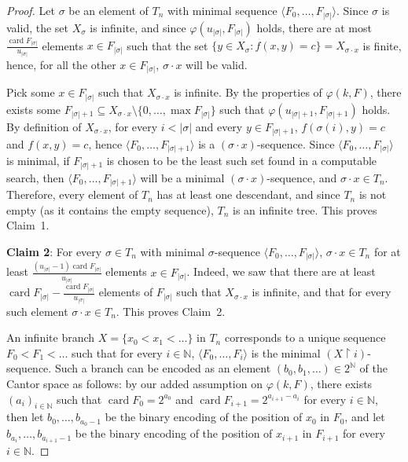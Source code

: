 \documentclass{article}
\numberwithin{theorem}{section}
\newcommand{\uh}{\upharpoonright}
\newcommand{\NN}[0]{\mathbb{N}}
\newcommand{\card}{\operatorname{card}}
\begin{document}
\begin{proof}
Let $\sigma$ be an element of $T_n$ with minimal sequence $\langle F_0, \dots, F_{|\sigma|}\rangle$. Since $\sigma$ is valid, the set $X_{\sigma}$ is infinite, and since $\varphi(u_{|\sigma|}, F_{|\sigma|})$ holds, there are at most $\frac{\card F_{|\sigma|}}{u_{|\sigma|}}$ elements $x \in F_{|\sigma|}$ such that the set $\{ y \in X_{\sigma} : f(x, y) = c \} = X_{\sigma \cdot x}$ is finite, hence, for all the other $x \in F_{|\sigma|}$, $\sigma \cdot x$ will be valid.

Pick some $x \in F_{|\sigma|}$ such that $X_{\sigma \cdot x}$ is infinite. By the properties of $\varphi(k,F)$, there exists some $F_{|\sigma| + 1} \subseteq X_{\sigma \cdot x} \setminus \{0, \dots, \max F_{|\sigma|}\}$ such that $\varphi(u_{|\sigma|+1}, F_{|\sigma| + 1})$ holds. By definition of $X_{\sigma \cdot x}$, for every $i < |\sigma|$ and every $y \in F_{|\sigma| + 1}$, $f(\sigma(i),y) = c$ and $f(x,y) = c$, hence $\langle F_0, \dots, F_{|\sigma| + 1}\rangle$ is a $(\sigma \cdot x)$-sequence. Since $\langle F_0, \dots, F_{|\sigma|}\rangle$ is minimal, if $F_{|\sigma| + 1}$ is chosen to be the least such set found in a computable search, then $\langle F_0, \dots, F_{|\sigma| + 1}\rangle$ will be a minimal $(\sigma \cdot x)$-sequence, and $\sigma \cdot x \in T_n$. Therefore, every element of $T_n$ has at least one descendant, and since $T_n$ is not empty (as it contains the empty sequence), $T_n$ is an infinite tree.
This proves Claim~1.

\smallskip
\textbf{Claim 2}: For every $\sigma \in T_n$ with minimal $\sigma$-sequence $\langle F_0, \dots, F_{|\sigma|}\rangle$, $\sigma \cdot x \in T_n$ for at least $\frac{(u_{|\sigma|}-1)\card F_{|\sigma|}}{u_{|\sigma|}}$ elements $x \in F_{|\sigma|}$. Indeed, we saw that there are at least $\card F_{|\sigma|} - \frac{\card F_{|\sigma|}}{u_{|\sigma|}}$ elements of $F_{|\sigma|}$ such that $X_{\sigma \cdot x}$ is infinite, and that for every such element $\sigma \cdot x \in T_n$.
This proves Claim~2.
\smallskip

An infinite branch $X = \{x_0 < x_1 < \dots \}$ in $T_n$ corresponds to a unique sequence $F_0 < F_1 < \dots$ such that for every $i \in \NN$, $\langle F_0, \dots, F_{i} \rangle$ is the minimal $(X \uh i)$-sequence. Such a branch can be encoded as an element $(b_0,b_1, \dots) \in 2^{\NN}$ of the Cantor space as follows: by our added assumption on $\varphi(k,F)$, there exists $(a_i)_{i \in \NN}$ such that $\card F_0 = 2^{a_0}$ and $\card F_{i+1} = 2^{a_{i+1} - a_i}$ for every $i \in \NN$, then let $b_0, \dots, b_{a_0 - 1}$ be the binary encoding of the position of $x_0$ in $F_0$, and let $b_{a_i}, \dots, b_{a_{i+1} - 1}$ be the binary encoding of the position of $x_{i+1}$ in $F_{i+1}$ for every $i \in \NN$.


\end{proof}
\end{document}
